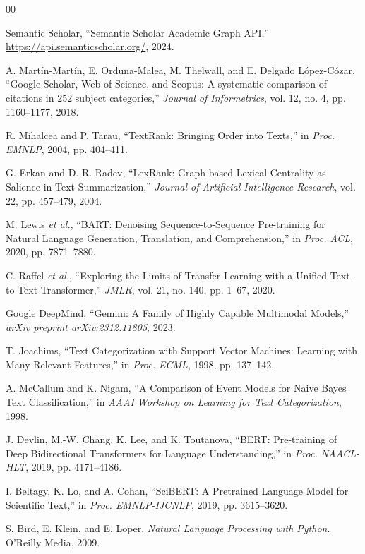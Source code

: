 \documentclass[conference]{IEEEtran}
\begin{document}
\begin{thebibliography}{00}

 Semantic Scholar, ``Semantic Scholar Academic Graph API,'' \url{https://api.semanticscholar.org/}, 2024.

 A. Mart\'{i}n-Mart\'{i}n, E. Orduna-Malea, M. Thelwall, and E. Delgado L\'{o}pez-C\'{o}zar, ``Google Scholar, Web of Science, and Scopus: A systematic comparison of citations in 252 subject categories,'' \textit{Journal of Informetrics}, vol. 12, no. 4, pp. 1160--1177, 2018.

 R. Mihalcea and P. Tarau, ``TextRank: Bringing Order into Texts,'' in \textit{Proc. EMNLP}, 2004, pp. 404--411.

 G. Erkan and D. R. Radev, ``LexRank: Graph-based Lexical Centrality as Salience in Text Summarization,'' \textit{Journal of Artificial Intelligence Research}, vol. 22, pp. 457--479, 2004.

 M. Lewis \textit{et al.}, ``BART: Denoising Sequence-to-Sequence Pre-training for Natural Language Generation, Translation, and Comprehension,'' in \textit{Proc. ACL}, 2020, pp. 7871--7880.

 C. Raffel \textit{et al.}, ``Exploring the Limits of Transfer Learning with a Unified Text-to-Text Transformer,'' \textit{JMLR}, vol. 21, no. 140, pp. 1--67, 2020.

 Google DeepMind, ``Gemini: A Family of Highly Capable Multimodal Models,'' \textit{arXiv preprint arXiv:2312.11805}, 2023.

 T. Joachims, ``Text Categorization with Support Vector Machines: Learning with Many Relevant Features,'' in \textit{Proc. ECML}, 1998, pp. 137--142.

 A. McCallum and K. Nigam, ``A Comparison of Event Models for Naive Bayes Text Classification,'' in \textit{AAAI Workshop on Learning for Text Categorization}, 1998.

 J. Devlin, M.-W. Chang, K. Lee, and K. Toutanova, ``BERT: Pre-training of Deep Bidirectional Transformers for Language Understanding,'' in \textit{Proc. NAACL-HLT}, 2019, pp. 4171--4186.

 I. Beltagy, K. Lo, and A. Cohan, ``SciBERT: A Pretrained Language Model for Scientific Text,'' in \textit{Proc. EMNLP-IJCNLP}, 2019, pp. 3615--3620.

 S. Bird, E. Klein, and E. Loper, \textit{Natural Language Processing with Python}. O'Reilly Media, 2009.


\end{thebibliography}
\end{document}
